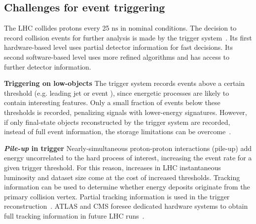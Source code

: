 

\begin{textbox}[!h]
\section{Challenges for event triggering}

The LHC collides protons every 25 $\mathrm{ns}$ in nominal conditions. %
The decision to record collision events for further analysis is made by the trigger system~\cite{Smith:2016vcs,Aaboud:2016leb,Khachatryan:2016bia}. 
Its first hardware-based level uses partial detector information for fast decisions.%
Its second software-based level uses more refined algorithms and has access to further detector information.%

\textbf{Triggering on low-\pt objects}
The trigger system records events above a certain threshold (e.g. leading jet \pt or event \MET), since energetic processes are likely to contain interesting features. 
Only a small fraction of events below these thresholds is recorded, penalizing signals with lower-energy signatures. 
However, if only final-state objects reconstructed by the trigger system are recorded, instead of full event information, the storage limitations can be overcome~\cite{Aaij:2016rxn,CMS-PAS-EXO-16-056,Aaboud:2016leb}. 

\textbf{\textit{Pile-up} in trigger} 
Nearly-simultaneous proton-proton interactions (pile-up) add energy uncorrelated to the hard process of interest, increasing the event rate for a given trigger threshold. 
For this reason, increases in LHC instantaneous luminosity and dataset size come at the cost of increased thresholds.%
Tracking information can be used to determine whether energy deposits originate from the primary collision vertex. 
Partial tracking information is used in the trigger reconstruction~\cite{CMS:2014ata,ATLAS-CONF-2014-019}. ATLAS and CMS foresee dedicated hardware systems to obtain full tracking information in future LHC runs~\cite{Shochet:2013gaw,1748-0221-6-12-C12065}. 
 
\end{textbox}

